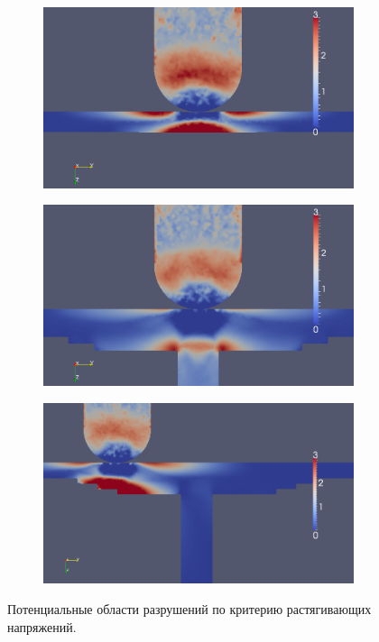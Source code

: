 \begin{figure}[htp]
\centering
\begin{subfigure}[b]{0.3\textwidth}
\center
\includegraphics[width=\textwidth]{png/pkm-experiment/wing-only/tension-2.png}
\end{subfigure}
\begin{subfigure}[b]{0.3\textwidth}
\center
\includegraphics[width=\textwidth]{png/pkm-experiment/wing-stringer/tension-2.png}
\end{subfigure}
\begin{subfigure}[b]{0.3\textwidth}
\center
\includegraphics[width=\textwidth]{png/pkm-experiment/wing-stringer-non-center/tension-2.png}
\end{subfigure}
\caption{Потенциальные области разрушений по критерию растягивающих напряжений.}
\label{pic:pkm_experiment_compare_tension}
\end{figure}

